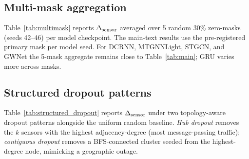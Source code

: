 

\subsection{Multi-mask aggregation}
\label{sec:appendix_multimask}

Table~\ref{tab:multimask} reports $\DeltaSensor$ averaged over 5 random 30\%
zero-masks (seeds 42--46) per model checkpoint.
The main-text results use the pre-registered primary mask per model seed.
For DCRNN, MTGNNLight, STGCN, and GWNet the 5-mask aggregate remains close to
Table~\ref{tab:main}; GRU varies more across masks.

\begin{table}[h]
\centering
\caption{Multi-mask sensor dropout: $\DeltaSensor$ mean and std over 5 random masks
(seeds 42--46), then averaged over 3 model seeds.
Most values are consistent with primary-mask results in Table~\ref{tab:main};
GRU is the exception noted in the protocol.}
\label{tab:multimask}
\vskip 0.1in
\end{table}

\subsection{Structured dropout patterns}
\label{sec:appendix_structured_dropout}

Table~\ref{tab:structured_dropout} reports $\DeltaSensor$ under two topology-aware
dropout patterns alongside the uniform random baseline.
\emph{Hub dropout} removes the $k$ sensors with the highest adjacency-degree (most
message-passing traffic); \emph{contiguous dropout} removes a BFS-connected cluster
seeded from the highest-degree node, mimicking a geographic outage.

